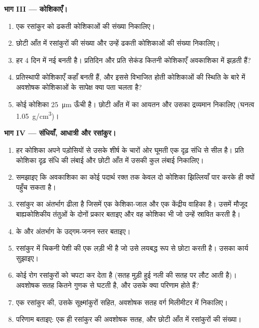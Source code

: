 \begin{problem}
\medskip
\noindent\textbf{भाग III --- कोशिकाएँ।}
\begin{enumerate}[resume]
  \item एक रसांकुर को ढकती  कोशिकाओं की संख्या निकालिए।
  \item छोटी आँत में रसांकुरों की संख्या और उन्हें ढकती  कोशिकाओं
        की संख्या निकालिए।
  \item {} हर \qty{4}{} दिन में नई बनती है। प्रतिदिन और प्रति सेकंड
        कितनी कोशिकाएँ अवकाशिका में झड़ती हैं?
  \item प्रतिस्थापी कोशिकाएँ कहाँ बनती हैं, और इससे विभाजित होती
        कोशिकाओं की स्थिति के बारे में अवशोषक कोशिकाओं के सापेक्ष क्या
        पता चलता है?
  \item कोई  कोशिका \qty{25}{\micro m} ऊँची है। छोटी आँत में
         का आयतन और उसका द्रव्यमान निकालिए (घनत्व
        \qty{1.05}{g/cm^3})।
\end{enumerate}

\medskip
\noindent\textbf{भाग IV --- संधियाँ, आधात्री और रसांकुर।}
\begin{enumerate}[resume]
  \item हर कोशिका अपने पड़ोसियों से उसके शीर्ष के चारों ओर घूमती एक
        दृढ़ संधि से सील है। प्रति कोशिका दृढ़ संधि की लंबाई और छोटी
        आँत में उसकी कुल लंबाई निकालिए।
  \item समझाइए कि अवकाशिका का कोई पदार्थ रक्त तक केवल दो कोशिका
        झिल्लियाँ पार करके ही क्यों पहुँच सकता है।
  \item रसांकुर का अंतर्भाग ढीला  है जिसमें एक केशिका-जाल और
        एक केंद्रीय  वाहिका है। उसमें मौजूद बाह्यकोशिकीय तंतुओं के
        दोनों प्रकार बताइए और वह कोशिका भी जो उन्हें स्रावित करती है।
  \item {} के और अंतर्भाग के उद्गम-जनन स्तर बताइए।
  \item रसांकुर में चिकनी पेशी की एक लड़ी भी है जो उसे लयबद्ध रूप से
        छोटा करती है। उसका कार्य सुझाइए।
  \item कोई रोग रसांकुरों को चपटा कर देता है (सतह मुड़ी हुई नली की सतह
        पर लौट आती है)। अवशोषक सतह कितने गुणक से घटती है, और उसके क्या
        परिणाम होते हैं?
  \item एक रसांकुर की, उसके सूक्ष्मांकुरों सहित, अवशोषक सतह वर्ग
        मिलीमीटर में निकालिए।
  \item परिणाम बताइए: एक ही रसांकुर की अवशोषक सतह, और छोटी आँत में
        रसांकुरों की संख्या।
\end{enumerate}
\end{problem}
